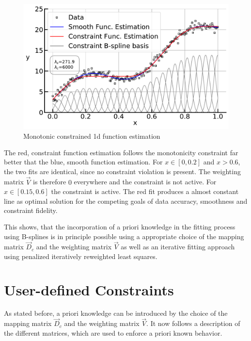 \documentclass[10pt,a4paper]{report}
\begin{document}
\begin{figure}[H]
	\centering
	\includegraphics[width=\linewidth]{../thesisplots/inc_spline.pdf}
	\caption{Monotonic constrained 1d function estimation}
	\label{fig:incspline}
\end{figure}	

The red, constraint function estimation follows the monotonicity constraint far better that the blue, smooth function estimation. For $x \in [0, 0.2]$ and $x > 0.6$, the two fits are identical, since no constraint violation is present. The weighting matrix $\vec{V}$ is therefore $0$ everywhere and the constraint is not active. For $x \in [0.15, 0.6]$ the constraint is active. The red fit produces a almost constant line as optimal solution for the competing goals of data accuracy, smoothness and constraint fidelity.

This shows, that the incorporation of a priori knowledge in the fitting process using B-splines is in principle possible using a appropriate choice of the mapping matrix $\vec{D}_c$ and the weighting matrix $\vec{V}$ as well as an iterative fitting approach using penalized iteratively reweighted least squares. 

\section{User-defined Constraints} \label{sec:user-defined-constraints}

As stated before, a priori knowledge can be introduced by the choice of the mapping matrix $\vec{D}_c$ and the weighting matrix $\vec{V}$. It now follows a description of the different matrices, which are used to enforce a priori known behavior. 
\end{document}
